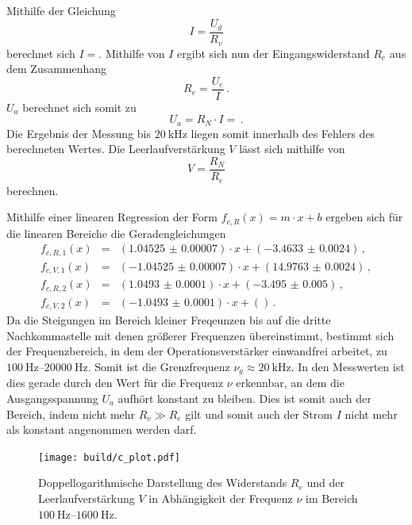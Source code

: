 Mithilfe der Gleichung
\begin{equation*}
    I = \frac{U_g}{R_v}
\end{equation*}
berechnet sich $I = $.
Mithilfe von $I$ ergibt sich nun der Eingangswiderstand $R_e$ aus dem Zusammenhang
\begin{equation*}
    R_e = \frac{U_e}{I}\,.
\end{equation*}
$U_a$ berechnet sich somit zu
\begin{equation*}
    U_a = R_N \cdot I =  \,.
\end{equation*}
Die Ergebnis der Messung bis $\SI{20}{\kilo\hertz}$ liegen somit innerhalb des Fehlers des berechneten Wertes.
Die Leerlaufverstärkung $V$ lässt sich mithilfe von 
\begin{equation*}
    V = \frac{R_N}{R_e}
\end{equation*}
berechnen.

Mithilfe einer linearen Regression der Form $f_{c,R}(x) = m \cdot x + b$ ergeben sich für die linearen Bereiche die Geradengleichungen 
\begin{eqnarray*}
    f_{c,R,1}(x) &=& (\num{1.04525(7)}) \cdot x + (\num{-3.4633(24)}) \,, \\
    f_{c,V,1}(x) &=& (\num{-1.04525(7)}) \cdot x + (\num{14.9763(24)}) \,, \\
    f_{c,R,2}(x) &=& (\num{1.0493(1)}) \cdot x + (\num{-3.495(5)}) \,, \\
    f_{c,V,2}(x) &=& (\num{-1.0493(1)}) \cdot x + ( ) \,.
\end{eqnarray*}
Da die Steigungen im Bereich kleiner Freqeunzen bis auf die dritte Nachkommastelle mit denen größerer Frequenzen übereinstimmt, bestimmt sich der Frequenzbereich, in dem der Operationsverstärker einwandfrei arbeitet, zu $\SIrange{100}{20000}{\hertz}$.
Somit ist die Grenzfrequenz $\nu_g \approx \SI{20}{\kilo\hertz}$.
In den Messwerten ist dies gerade durch den Wert für die Frequenz $\nu$ erkennbar, an dem die Ausgangsspannung $U_a$ aufhört konstant zu bleiben.
Dies ist somit auch der Bereich, indem nicht mehr $R_v \gg R_e$ gilt und somit auch der Strom $I$ nicht mehr als konstant angenommen werden darf.

\begin{figure}[h!]
    \centering
    \texttt{[image: build/c\_plot.pdf]}
    \caption{Doppellogarithmische Darstellung des Widerstands $R_e$ und der Leerlaufverstärkung $V$ in Abhängigkeit der Frequenz $\nu$ im Bereich $\SIrange{100}{1600}{\hertz}$.}
    \label{fig:c_plot}
\end{figure}

